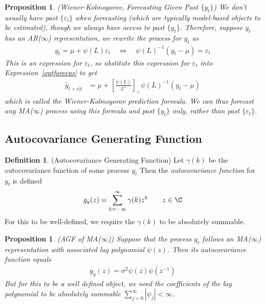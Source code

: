 \documentclass[12pt]{article}
\theoremstyle{plain}
\newtheorem{prop}[thm]{Proposition}
\theoremstyle{definition}
\newtheorem{defn}[thm]{Definition}
\theoremstyle{remark}
\begin{document}
\begin{prop}\emph{(Wiener-Kolmogorov, Forecasting Given Past $\{y_t\}$)}
We don't usually have past $\{\varepsilon_t\}$ when forecasting (which
are typically model-based objects to be estimated), though we always
have access to past $\{y_t\}$. Therefore, suppose $y_t$ has an
AR($\infty$) representation, we rewrite the process for $y_t$ as
\begin{align*}
  y_t = \mu + \psi(L)\varepsilon_t
  \quad\iff\quad
  \psi(L)^{-1}(y_t - \mu) = \varepsilon_t
\end{align*}
This is an expression for $\varepsilon_t$, so ubstitute this expression
for $\varepsilon_t$ into Expression~\ref{optforeeps} to get
\begin{align}
  \hat{y}_{t+s|t}
  &= \mu + \left[\frac{\psi(L)}{L^s}\right]_+
  \psi(L)^{-1}(y_t - \mu)
  \label{wienerkolmogorov}
\end{align}
which is called the \emph{Wiener-Kolmogorov prediction formula}. We can
thus forecast any MA($\infty$) process using this formula and past
$\{y_t\}$ only, rather than past $\{\varepsilon_t\}$.
\end{prop}

\clearpage
\subsection{Autocovariance Generating Function}

\begin{defn}(Autocovariance Generating Function)
Let $\gamma(k)$ be the autocovariance function of some process $y_t$
Then the \emph{autocovariance function} for $y_t$ is defined
\begin{align*}
  g_y(z) = \sum_{k=-\infty}^\infty \gamma(k)z^k
  \qquad z\in\C
\end{align*}
For this to be well-defined, we require the $\gamma(k)$ to be absolutely
summable.
\end{defn}

\begin{prop}\emph{(AGF of MA($\infty$))}
Suppose that the process $y_t$ follows an MA($\infty$) representation
with associated lag polynomial $\psi(z)$.
Then its autocovariance function equals
\begin{align*}
  g_y(z) = \sigma^2 \psi(z)\psi(z^{-1})
\end{align*}
But for this to be a well defined object, we need the coefficients of
the lag polynomial to be absolutely summable
$\sum_{j=0}^\infty|\psi_j|<\infty$.
\end{prop}
\end{document}
